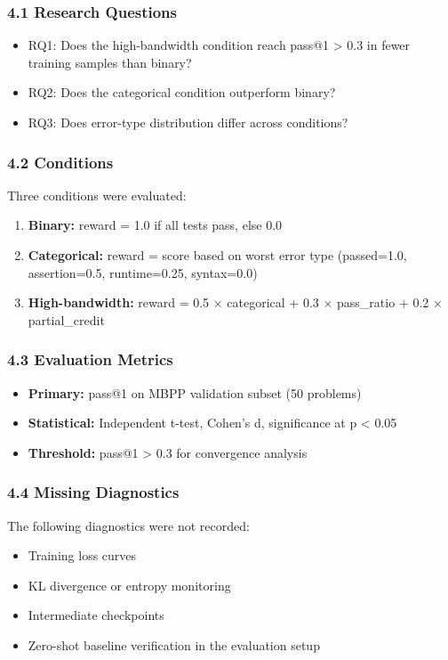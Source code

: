 
\subsubsection{4.1 Research Questions}

\begin{itemize}
\item RQ1: Does the high-bandwidth condition reach pass@1 > 0.3 in fewer training samples than binary?
\item RQ2: Does the categorical condition outperform binary?
\item RQ3: Does error-type distribution differ across conditions?
\end{itemize}

\subsubsection{4.2 Conditions}

Three conditions were evaluated:

\begin{enumerate}
\item \textbf{Binary:} reward = 1.0 if all tests pass, else 0.0
\item \textbf{Categorical:} reward = score based on worst error type (passed=1.0, assertion=0.5, runtime=0.25, syntax=0.0)
\item \textbf{High-bandwidth:} reward = 0.5 $\times$ categorical + 0.3 $\times$ pass\_ratio + 0.2 $\times$ partial\_credit
\end{enumerate}

\subsubsection{4.3 Evaluation Metrics}

\begin{itemize}
\item \textbf{Primary:} pass@1 on MBPP validation subset (50 problems)
\item \textbf{Statistical:} Independent t-test, Cohen's d, significance at p < 0.05
\item \textbf{Threshold:} pass@1 > 0.3 for convergence analysis
\end{itemize}

\subsubsection{4.4 Missing Diagnostics}

The following diagnostics were not recorded:
\begin{itemize}
\item Training loss curves
\item KL divergence or entropy monitoring
\item Intermediate checkpoints
\item Zero-shot baseline verification in the evaluation setup
\end{itemize}
